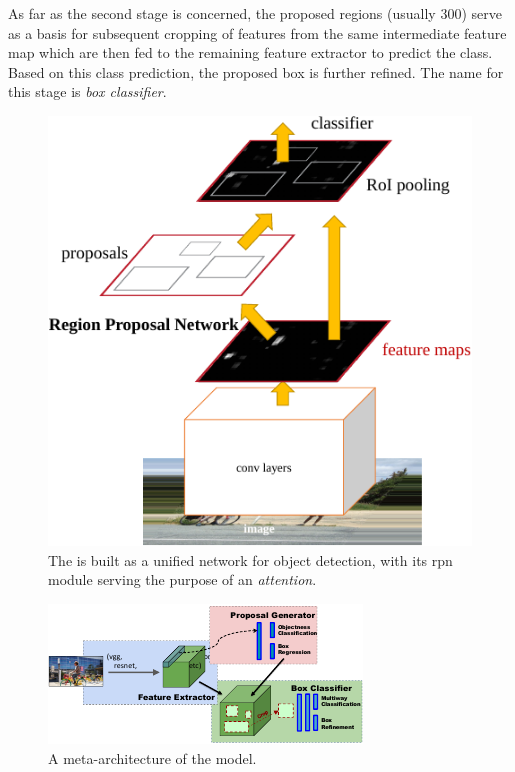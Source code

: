 As far as the second stage is concerned, the proposed regions (usually $300$) serve as a basis for subsequent cropping of features from the same intermediate feature map which are then fed to the remaining feature extractor to predict the class. Based on this class prediction, the proposed box is further refined. The name for this stage is \emph{box classifier}.

\begin{figure}[t]
    \centerline{\includegraphics[width=0.5\linewidth]{figures/theoretical_foundations/faster_rcnn_rpn_module.pdf}}
    \caption[\fasterrcnn{} with the \gls{rpn}]{The \fasterrcnn{} is built as a unified network for object detection, with its \gls{rpn} module serving the purpose of an \emph{attention}. }
    \label{fig:FasterRCNNRPN}
\end{figure}

\begin{figure}[t]
    \centerline{\includegraphics[width=0.65\linewidth]{figures/theoretical_foundations/faster_rcnn_metaarchitecture.pdf}}
    \caption[\fasterrcnn{} meta-architecture]{A meta-architecture of the \fasterrcnn{} model. }
    \label{fig:FasterRCNNMetaArch}
\end{figure}

